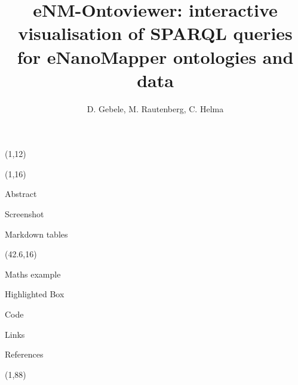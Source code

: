 \documentclass[final]{beamer}
\title{eNM-Ontoviewer: interactive visualisation of SPARQL queries for eNanoMapper ontologies and data}
\author{D. Gebele, M. Rautenberg, C. Helma}
\institute{\emph{in silico} toxicology gmbh, Basel, Switzerland}
\begin{document}
  \begin{frame}{}

    \begin{textblock}{80}(1,12)
        
    \end{textblock}

    \begin{textblock}{40.5}(1,16)
      \begin{block}{Abstract}
        
      \end{block}

      \begin{block}{Screenshot}
        
      \end{block}

      \begin{block}{Markdown tables}
        
      \end{block}

    \end{textblock}

    \begin{textblock}{40.5}(42.6,16)

      \begin{block}{Maths example}
        
      \end{block}

      \begin{alertblock}{Highlighted Box}
        
      \end{alertblock}

      \begin{block}{Code}
        
      \end{block}

      \begin{exampleblock}{Links}
        
      \end{exampleblock}

      \begin{block}{References}
        \small
      \end{block}

    \end{textblock}

    \begin{textblock}{82.1}(1,88)
      
    \end{textblock}

  \end{frame}
\end{document}
